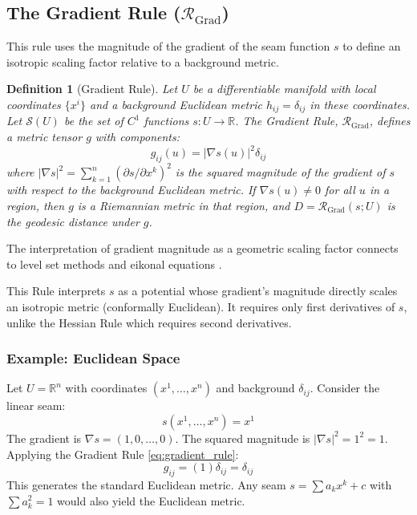 \documentclass[twoside,twocolumn]{article}
\newtheorem{definition}{Definition}[subsection] %
\begin{document}
\subsection{The Gradient Rule (\( \mathcal{R}_{\text{Grad}} \))}
\setcounter{definition}{0}

This rule uses the magnitude of the gradient of the seam function $s$ to define an isotropic scaling factor relative to a background metric.

\begin{definition}[Gradient Rule]
Let \( U \) be a differentiable manifold with local coordinates \( \{x^i\} \) and a background Euclidean metric \( h_{ij} = \delta_{ij} \) in these coordinates. Let \( \mathcal{S}(U) \) be the set of \( C^1 \) functions \( s: U \to \mathbb{R} \). The \emph{Gradient Rule}, \( \mathcal{R}_{\text{Grad}} \), defines a metric tensor \( g \) with components:
\begin{equation}
g_{ij}(u) = |\nabla s(u)|^2 \delta_{ij}
\label{eq:gradient_rule}
\end{equation}
where \( |\nabla s|^2 = \sum_{k=1}^n (\partial s / \partial x^k)^2 \) is the squared magnitude of the gradient of \( s \) with respect to the background Euclidean metric. If \( \nabla s(u) \neq 0 \) for all \( u \) in a region, then \( g \) is a Riemannian metric in that region, and \( D = \mathcal{R}_{\text{Grad}}(s; U) \) is the geodesic distance under \( g \).
\end{definition}
The interpretation of gradient magnitude as a geometric scaling factor connects to level set methods and eikonal equations \cite{Sethian1999}.

This Rule interprets \( s \) as a potential whose gradient’s magnitude directly scales an isotropic metric (conformally Euclidean). It requires only first derivatives of \( s \), unlike the Hessian Rule which requires second derivatives.

\subsubsection{Example: Euclidean Space}
Let $U = \mathbb{R}^n$ with coordinates $(x^1, \dots, x^n)$ and background $\delta_{ij}$. Consider the linear seam:
$$ s(x^1, \dots, x^n) = x^1 $$
The gradient is $\nabla s = (1, 0, \dots, 0)$. The squared magnitude is $|\nabla s|^2 = 1^2 = 1$. Applying the Gradient Rule \eqref{eq:gradient_rule}:
$$ g_{ij} = (1) \delta_{ij} = \delta_{ij} $$
This generates the standard Euclidean metric. Any seam $s = \sum a_k x^k + c$ with $\sum a_k^2 = 1$ would also yield the Euclidean metric.
\end{document}

